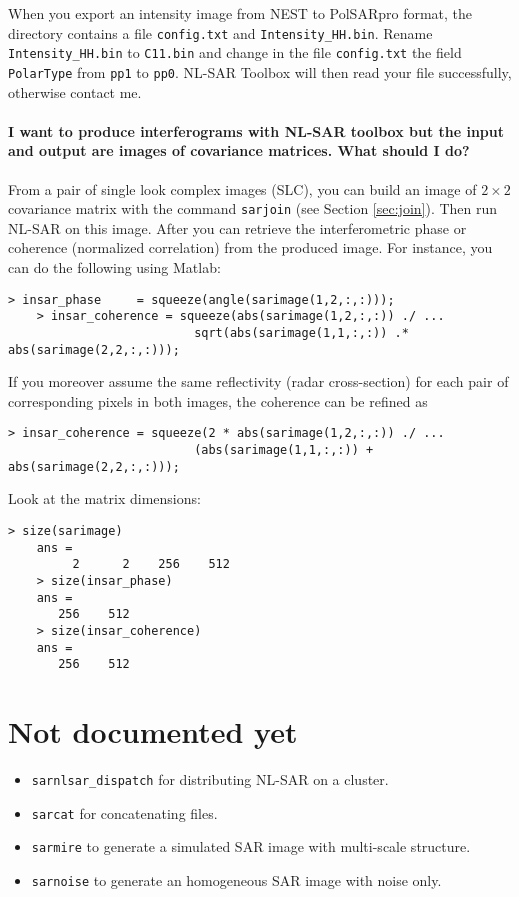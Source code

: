 \documentclass[10pt,french,english,a4paper]{article}
\begin{document}
When you export an intensity image from NEST to PolSARpro format, the directory contains
a file \texttt{config.txt} and \texttt{Intensity\_HH.bin}.
Rename \texttt{Intensity\_HH.bin} to \texttt{C11.bin} and change
in the file \texttt{config.txt} the field \texttt{PolarType} from
\texttt{pp1} to \texttt{pp0}.
NL-SAR Toolbox will then read your file successfully, otherwise contact me.

\paragraph{\bf I want to produce interferograms with NL-SAR toolbox
but the input and output are images of covariance matrices. What should I do?}

From a pair of single look complex images (SLC), you can build an image of $2 \times 2$
covariance matrix with the command \texttt{sarjoin} (see Section \ref{sec:join}).
Then run NL-SAR on this image. After you can retrieve the interferometric phase or
coherence (normalized correlation) from the produced image. For instance,
you can do the following using Matlab:

  \begin{Verbatim}[frame=single]
    > insar_phase     = squeeze(angle(sarimage(1,2,:,:)));
    > insar_coherence = squeeze(abs(sarimage(1,2,:,:)) ./ ...
                          sqrt(abs(sarimage(1,1,:,:)) .* abs(sarimage(2,2,:,:)));
  \end{Verbatim}

If you moreover assume the same reflectivity (radar cross-section) for each pair
of corresponding pixels in both images,
the coherence can be refined as

  \begin{Verbatim}[frame=single]
    > insar_coherence = squeeze(2 * abs(sarimage(1,2,:,:)) ./ ...
                          (abs(sarimage(1,1,:,:)) + abs(sarimage(2,2,:,:)));
  \end{Verbatim}

Look at the matrix dimensions:
  \begin{Verbatim}[frame=single]
    > size(sarimage)
    ans =
         2      2    256    512
    > size(insar_phase)
    ans =
       256    512
    > size(insar_coherence)
    ans =
       256    512
  \end{Verbatim}

\section{Not documented yet}

\begin{itemize}
\item
\texttt{sarnlsar\_dispatch} for distributing NL-SAR on a cluster.
\item
\texttt{sarcat} for concatenating files.
\item
\texttt{sarmire} to generate a simulated SAR image with multi-scale structure.
\item
\texttt{sarnoise} to generate an homogeneous SAR image with noise only.
\end{itemize}
\end{document}
